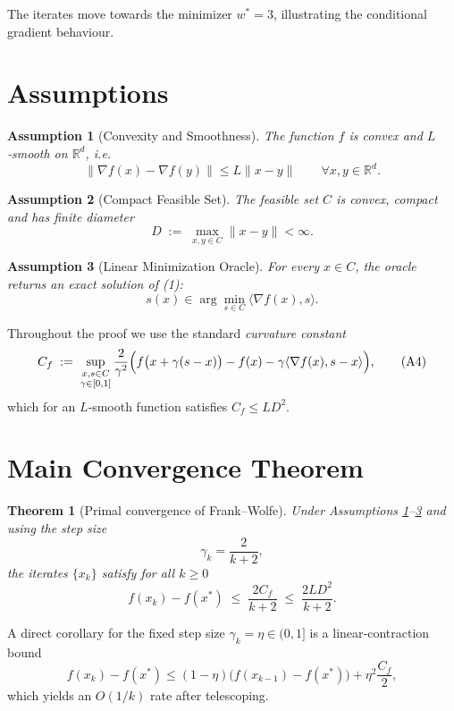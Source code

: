 \documentclass{article}
\newtheorem{theorem}{Theorem}
\newtheorem{assumption}{Assumption}
\newcommand{\R}{\mathbb{R}}
\begin{document}
The iterates move towards the minimizer $w^{*}=3$, illustrating the conditional gradient behaviour.

\section*{Assumptions}
\begin{assumption}[Convexity and Smoothness]\label{as:convexsmooth}
The function $f$ is convex and $L$‑smooth on $\R^{d}$, i.e.
\[
\|\nabla f(x)-\nabla f(y)\| \le L\|x-y\|\qquad\forall x,y\in\R^{d}.
\tag{A1}
\]
\end{assumption}
\begin{assumption}[Compact Feasible Set]\label{as:compact}
The feasible set $C$ is convex, compact and has finite diameter
\[
D \;:=\; \max_{x,y\in C}\|x-y\| <\infty .
\tag{A2}
\]
\end{assumption}
\begin{assumption}[Linear Minimization Oracle]\label{as:lmo}
For every $x\in C$, the oracle returns an exact solution of (1):
\[
s(x) \in\arg\min_{s\in C}\langle \nabla f(x),s\rangle .
\tag{A3}
\]
\end{assumption}

\noindent Throughout the proof we use the standard \emph{curvature constant}
\[
C_f \;:=\; \sup_{\substack{x,s\in C\\ \gamma\in[0,1]}}
\frac{2}{\gamma^{2}}\Bigl(f\bigl(x+\gamma(s-x)\bigr)-f(x)-\gamma\langle\nabla f(x),s-x\rangle\Bigr),
\tag{A4}
\]
which for an $L$‑smooth function satisfies $C_f\le L D^{2}$.

\section*{Main Convergence Theorem}
\begin{theorem}[Primal convergence of Frank–Wolfe]\label{thm:fw}
Under Assumptions \ref{as:convexsmooth}–\ref{as:lmo} and using the step size
\[
\gamma_k = \frac{2}{k+2},
\tag{S1}
\]
the iterates $\{x_k\}$ satisfy for all $k\ge0$
\[
f(x_k)-f(x^{*}) \;\le\; \frac{2C_f}{k+2}
\;\le\; \frac{2L D^{2}}{k+2}.
\tag{T1}
\]
\end{theorem}

\noindent A direct corollary for the fixed step size $\gamma_k=\eta\in(0,1]$ is a linear‑contraction bound
\[
f(x_{k})-f(x^{*})\le (1-\eta)\bigl(f(x_{k-1})-f(x^{*})\bigr)+\eta^{2}\frac{C_f}{2},
\tag{T2}
\]
which yields an $O(1/k)$ rate after telescoping.
\end{document}
